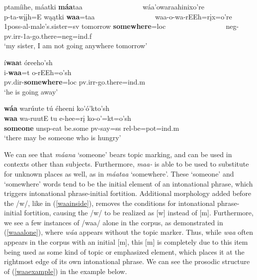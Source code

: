 \begin{exe}
\begin{xlist}
	\item\label{waaexample} \glll ptamíihe, máatki \textbf{máa}taa ~ ~ ~ ~ ~ ~ ~ ~ ~ ~ wáa'owaraahinixo're\\
	p-ta-wįįh=E wąątki \textbf{waa}=taa ~ ~ ~ ~ ~ ~ ~ ~ ~ ~  waa-o-wa-rEEh=rįx=o're\\
	1poss-al-\textnormal{male's.sister}=sv \textnormal{tomorrow} \textbf{\textnormal{somewhere}}=loc ~ ~ ~ ~ ~ ~ ~ ~ ~ ~  neg-pv.irr-1a-\textnormal{go.there}=neg=ind.f\\
	\glt `my sister, I am not going anywhere tomorrow' \citep[284]{hollow1973a}
	
	\item\label{waainside} \glll í\textbf{waa}t óreeho'sh\\
	i-\textbf{waa}=t o-rEEh=o'sh\\
	pv.dir-\textbf{\textnormal{somewhere}}=loc pv.irr-\textnormal{go.there}=ind.m\\
	\glt `he is going away' \citep[265]{hollow1970}
	
	\item\label{waaalone} \glll \textbf{wáa} warúute tú éheeni ko'ó'kto'sh\\
	\textbf{waa} wa-ruutE tu e-hee=rį ko-o'=kt=o'sh\\
	\textbf{\textnormal{someone}} unsp-\textnormal{eat} \textnormal{be.some} pv-\textnormal{say}=ss rel-\textnormal{be}=pot=ind.m\\
	\glt `there may be someone who is hungry' \citep[159]{trechter2012b}
	
	
	\end{xlist}

\end{exe}

We can see that \textit{máana} `someone' bears topic marking, and can be used in contexts other than subjects. Furthermore, \textit{maa-} is able to be used to substitute for unknown places as well, as in \textit{máataa} `somewhere'. These `someone' and `somewhere' words tend to be the initial element of an intonational phrase, which triggers intonational phrase-initial fortition. Additional morphology added before the /w/, like in (\ref{waainside}), removes the conditions for intonational phrase-initial fortition, causing the /w/ to be realized as [w] instead of [m]. Furthermore, we see a few instances of /waa/ alone in the corpus, as demonstrated in (\ref{waaalone}), where \textit{wáa} appears without the topic marker. Thus, while \textit{waa} often appears in the corpus with an initial [m], this [m] is completely due to this item being used as some kind of topic or emphasized element, which places it at the rightmost edge of its own intonational phrase. We can see the prosodic structure of (\ref{waaexample}) in the example below.

